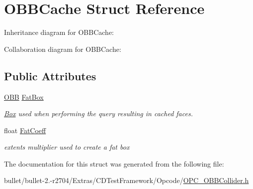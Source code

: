 \hypertarget{struct_o_b_b_cache}{\section{O\+B\+B\+Cache Struct Reference}
\label{struct_o_b_b_cache}
}


Inheritance diagram for O\+B\+B\+Cache\+:


Collaboration diagram for O\+B\+B\+Cache\+:
\subsection*{Public Attributes}
\begin{DoxyCompactItemize}
\item 
\hypertarget{struct_o_b_b_cache_a732722cc39003e86a3204ff3cbcf3003}{\hyperlink{class_o_b_b}{O\+B\+B} \hyperlink{struct_o_b_b_cache_a732722cc39003e86a3204ff3cbcf3003}{Fat\+Box}}\label{struct_o_b_b_cache_a732722cc39003e86a3204ff3cbcf3003}

\begin{DoxyCompactList}\small\item\em \hyperlink{class_box}{Box} used when performing the query resulting in cached faces. \end{DoxyCompactList}\item 
\hypertarget{struct_o_b_b_cache_ae7cfbbbb388fc4b0df6c5eac57f7fc6f}{float \hyperlink{struct_o_b_b_cache_ae7cfbbbb388fc4b0df6c5eac57f7fc6f}{Fat\+Coeff}}\label{struct_o_b_b_cache_ae7cfbbbb388fc4b0df6c5eac57f7fc6f}

\begin{DoxyCompactList}\small\item\em extents multiplier used to create a fat box \end{DoxyCompactList}\end{DoxyCompactItemize}


The documentation for this struct was generated from the following file\+:\begin{DoxyCompactItemize}
\item 
bullet/bullet-\/2.-\/r2704/\+Extras/\+C\+D\+Test\+Framework/\+Opcode/\hyperlink{_o_p_c___o_b_b_collider_8h}{O\+P\+C\+\_\+\+O\+B\+B\+Collider.\+h}\end{DoxyCompactItemize}

